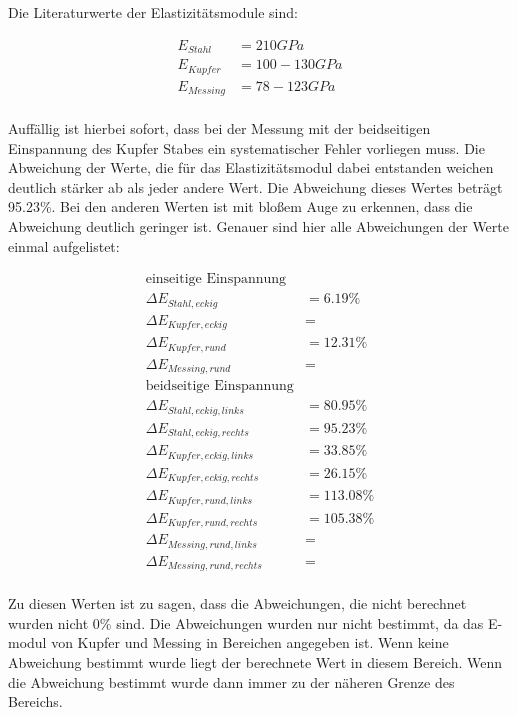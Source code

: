 \noindent Die Literaturwerte der Elastizitätsmodule sind: 

\begin{align*}
    E_{Stahl} &= 210GPa\\
    E_{Kupfer} &= 100-130GPa\\
    E_{Messing} &= 78-123GPa\\
\end{align*}

\noindent Auffällig ist hierbei sofort, dass bei der Messung mit der beidseitigen Einspannung des Kupfer Stabes ein systematischer Fehler vorliegen muss. Die Abweichung der Werte, die für das Elastizitätsmodul dabei entstanden weichen deutlich stärker ab als jeder andere Wert. Die Abweichung dieses Wertes beträgt 95.23\%. Bei den anderen Werten ist mit bloßem Auge zu erkennen, dass die Abweichung deutlich geringer ist. Genauer sind hier alle Abweichungen der Werte einmal aufgelistet:

\begin{align*}
    \text{einseitige Einspannung}\\
    \Delta E_{Stahl, eckig} &= 6.19\% \\
    \Delta E_{Kupfer, eckig} &=  \\
    \Delta E_{Kupfer, rund} &= 12.31\% \\
    \Delta E_{Messing, rund} &=  \\
    \text{beidseitige Einspannung} \\
    \Delta E_{Stahl, eckig, links} &= 80.95\% \\
    \Delta E_{Stahl, eckig, rechts} &= 95.23\%\\
    \Delta E_{Kupfer, eckig, links} &= 33.85\%\\
    \Delta E_{Kupfer, eckig, rechts} &= 26.15\%\\
    \Delta E_{Kupfer ,rund, links} &= 113.08\%\\
    \Delta E_{Kupfer , rund, rechts} &= 105.38\%\\
    \Delta E_{Messing, rund, links} &= \\
    \Delta E_{Messing, rund, rechts} &= \\
\end{align*}

\noindent Zu diesen Werten ist zu sagen, dass die Abweichungen, die nicht berechnet wurden nicht 0\% sind. Die Abweichungen wurden nur nicht bestimmt, da das E-modul von Kupfer und Messing in Bereichen angegeben ist. Wenn keine Abweichung bestimmt wurde liegt der berechnete Wert in diesem Bereich. Wenn die Abweichung bestimmt wurde dann immer zu der näheren Grenze des Bereichs. 

